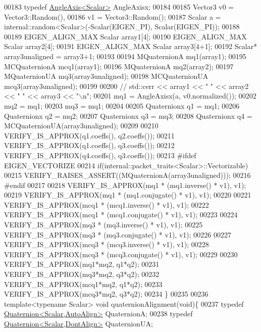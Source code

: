 \begin{DoxyCode}
00183   \textcolor{keyword}{typedef} \hyperlink{group___geometry___module_class_eigen_1_1_angle_axis}{AngleAxis<Scalar>} AngleAxisx;
00184   
00185   Vector3 v0 = Vector3::Random(),
00186           v1 = Vector3::Random();
00187   Scalar  a = internal::random<Scalar>(-Scalar(EIGEN\_PI), Scalar(EIGEN\_PI));
00188 
00189   EIGEN\_ALIGN\_MAX Scalar array1[4];
00190   EIGEN\_ALIGN\_MAX Scalar array2[4];
00191   EIGEN\_ALIGN\_MAX Scalar array3[4+1];
00192   Scalar* array3unaligned = array3+1;
00193   
00194   MQuaternionA    mq1(array1);
00195   MCQuaternionA   mcq1(array1);
00196   MQuaternionA    mq2(array2);
00197   MQuaternionUA   mq3(array3unaligned);
00198   MCQuaternionUA  mcq3(array3unaligned);
00199 
00200 \textcolor{comment}{//  std::cerr << array1 << " " << array2 << " " << array3 << "\(\backslash\)n";}
00201   mq1 = AngleAxisx(a, v0.normalized());
00202   mq2 = mq1;
00203   mq3 = mq1;
00204 
00205   Quaternionx q1 = mq1;
00206   Quaternionx q2 = mq2;
00207   Quaternionx q3 = mq3;
00208   Quaternionx q4 = MCQuaternionUA(array3unaligned);
00209 
00210   VERIFY\_IS\_APPROX(q1.coeffs(), q2.coeffs());
00211   VERIFY\_IS\_APPROX(q1.coeffs(), q3.coeffs());
00212   VERIFY\_IS\_APPROX(q4.coeffs(), q3.coeffs());
00213 \textcolor{preprocessor}{  #ifdef EIGEN\_VECTORIZE}
00214   \textcolor{keywordflow}{if}(internal::packet\_traits<Scalar>::Vectorizable)
00215     VERIFY\_RAISES\_ASSERT((MQuaternionA(array3unaligned)));
00216 \textcolor{preprocessor}{  #endif}
00217     
00218   VERIFY\_IS\_APPROX(mq1 * (mq1.inverse() * v1), v1);
00219   VERIFY\_IS\_APPROX(mq1 * (mq1.conjugate() * v1), v1);
00220   
00221   VERIFY\_IS\_APPROX(mcq1 * (mcq1.inverse() * v1), v1);
00222   VERIFY\_IS\_APPROX(mcq1 * (mcq1.conjugate() * v1), v1);
00223   
00224   VERIFY\_IS\_APPROX(mq3 * (mq3.inverse() * v1), v1);
00225   VERIFY\_IS\_APPROX(mq3 * (mq3.conjugate() * v1), v1);
00226   
00227   VERIFY\_IS\_APPROX(mcq3 * (mcq3.inverse() * v1), v1);
00228   VERIFY\_IS\_APPROX(mcq3 * (mcq3.conjugate() * v1), v1);
00229   
00230   VERIFY\_IS\_APPROX(mq1*mq2, q1*q2);
00231   VERIFY\_IS\_APPROX(mq3*mq2, q3*q2);
00232   VERIFY\_IS\_APPROX(mcq1*mq2, q1*q2);
00233   VERIFY\_IS\_APPROX(mcq3*mq2, q3*q2);
00234 \}
00235 
00236 \textcolor{keyword}{template}<\textcolor{keyword}{typename} Scalar> \textcolor{keywordtype}{void} quaternionAlignment(\textcolor{keywordtype}{void})\{
00237   \textcolor{keyword}{typedef} \hyperlink{group___geometry___module_class_eigen_1_1_quaternion}{Quaternion<Scalar,AutoAlign>} QuaternionA;
00238   \textcolor{keyword}{typedef} \hyperlink{group___geometry___module_class_eigen_1_1_quaternion}{Quaternion<Scalar,DontAlign>} QuaternionUA;

\end{DoxyCode}
